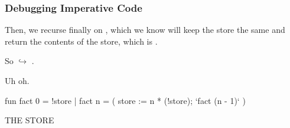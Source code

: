 \documentclass[aspectratio=169]{beamer}
\begin{document}
\begin{frame}[fragile]
  \frametitle{Debugging Imperative Code}

  \begin{minipage}[t][0.6in][t]{\textwidth}
    Then, we recurse finally on , which we know will keep the store
    the same and return the contents of the store, which is .

    \vspace{\fill}

    So  $\hookrightarrow$ .

    \vspace{\fill}

    Uh oh.
  \end{minipage}

  \vspace{10pt}

  \begin{center}
    \begin{minipage}[t][1.7in][t]{0.6\textwidth}
      \vspace{\fill}
      \begin{codeblock}
        fun fact 0 = !store
          | fact n =
              ( store := n * (!store);
                `fact (n - 1)`
              )
      \end{codeblock}
      \vspace{\fill}
    \end{minipage}
    \hfill\vline\hfill
    \begin{minipage}[t][1.7in][t]{0.3\textwidth}
      \centering
      {\hspace{-20pt}\color{gray} \large THE STORE}

      \vspace{\fill}
      \vspace{\fill}
    \end{minipage}
  \end{center}
\end{frame}
\end{document}
